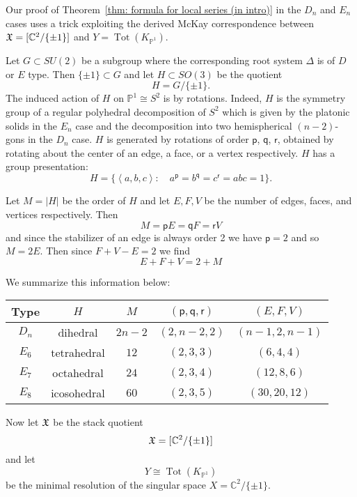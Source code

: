 \documentclass{article}
\theoremstyle{definition}
\newcommand{\CC} {{\mathbb C}}          %
\newcommand{\PP}{\mathbb{P}}
\newcommand{\X}{\frak{X}}
\newcommand{\varp}{\mathsf{p}}
\newcommand{\varq}{\mathsf{q}}
\newcommand{\varr}{\mathsf{r}}
\begin{document}
Our proof of Theorem~\ref{thm: formula for local series (in intro)} in
the $D_{n}$ and $E_{n}$ cases uses a trick exploiting the derived
McKay correspondence between $\X =[\CC^{2}/\{\pm 1 \}]$ and
$Y=\operatorname{Tot}(K_{\PP^{1}})$. 

Let $G\subset SU(2)$ be a subgroup where the corresponding root system
$\Delta$ is of $D$ or $E$ type. Then $\{\pm 1 \}\subset G$ and let
$H\subset SO(3)$ be the quotient
\[
H=G/\{\pm 1 \}.
\]
The induced action of $H$ on $\PP^{1}\cong S^{2}$ is by
rotations. Indeed, $H$ is the symmetry group of a regular polyhedral
decomposition of $S^{2}$ which is given by the platonic solids in the
$E_{n}$ case and the decomposition into two hemispherical $(n-2)$-gons
in the $D_{n}$ case. $H$ is generated by rotations of order $\varp$,
$\varq$, $\varr$, obtained by rotating about the center of an edge, a
face, or a vertex respectively. $H$ has a group presentation:
\[
H=\{\left\langle a,b,c \right\rangle :\quad a^{\varp} = b^{\varq} =
c^{\varr} = abc=1 \}.
\]

Let $M=|H|$ be the order of $H$ and let $E,F,V$ be the number of
edges, faces, and vertices respectively. Then
\[
M=\varp E = \varq F = \varr V
\]
and since the stabilizer of an edge is always order 2 we have $\varp =2$
and so $M=2E$. Then since $F+V-E=2$ we find
\[
E+F+V = 2 + M
\]

We summarize this information below:

\begin{center}
\begin{tabular}{|c|c|c|c|c|}
\hline
Type &	$H$ &	$M$&	$(\varp ,\varq ,\varr )$ &	$(E,F,V)$\\ \hline \hline 
$D_{n}$     & dihedral & $2n-2$ & $(2,n-2,2)$& $(n-1,2,n-1)$	\\ \hline
$E_{6}$     & tetrahedral & $12$ & $(2,3,3)$& $(6,4,4)$	\\ \hline
$E_{7}$     & octahedral & $24$ & $(2,3,4)$& $(12,8,6)$	\\ \hline
$E_{8}$     & icosohedral & $60$ & $(2,3,5)$& $(30,20,12)$	\\ \hline
\end{tabular}
\end{center}

\bigskip

Now let $\X$ be the stack quotient
\[
\X=[\CC^{2}/ \{\pm 1 \}]
\]
and let
\[
Y\cong \operatorname{Tot}(K_{\PP^{1}})
\]
be the minimal resolution of the singular space $X=\CC^{2}/\{\pm 1
\}$.
\end{document}
